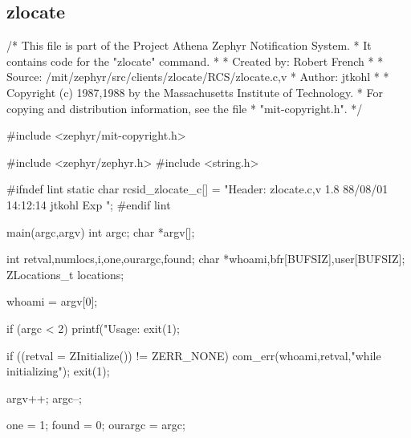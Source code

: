 %
\subsection{zlocate}
\label{ex-zlocate}

\begin{code}
/* This file is part of the Project Athena Zephyr Notification System.
 * It contains code for the "zlocate" command.
 *
 *      Created by:     Robert French
 *
 *      Source: /mit/zephyr/src/clients/zlocate/RCS/zlocate.c,v 
 *      Author: jtkohl 
 *
 *      Copyright (c) 1987,1988 by the Massachusetts Institute of Technology.
 *      For copying and distribution information, see the file
 *      "mit-copyright.h". 
 */

#include <zephyr/mit-copyright.h>

#include <zephyr/zephyr.h>
#include <string.h>

#ifndef lint
static char rcsid_zlocate_c[] =
 "Header: zlocate.c,v 1.8 88/08/01 14:12:14 jtkohl Exp ";
#endif lint

main(argc,argv)
        int argc;
        char *argv[];
{
        int retval,numlocs,i,one,ourargc,found;
        char *whoami,bfr[BUFSIZ],user[BUFSIZ];
        ZLocations_t locations;
        
        whoami = argv[0];

        if (argc < 2) {
                printf("Usage: %
                exit(1);
        }
        
        if ((retval = ZInitialize()) != ZERR_NONE) {
                com_err(whoami,retval,"while initializing");
                exit(1);
        } 

        argv++;
        argc--;

        one = 1;
        found = 0;
        ourargc = argc;
        
}
\end{code}

